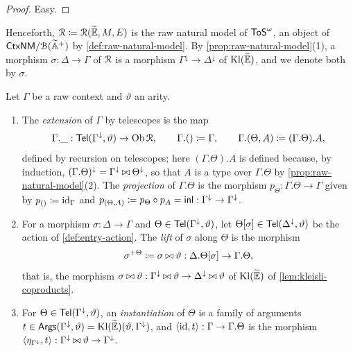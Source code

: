 \begin{proof}
    Easy.
\end{proof}

Henceforth, $\mathcal{R} \coloneqq \mathcal{R}(\widetilde{\mathbb{E}}, M, E)$ is the raw natural model of $\mathsf{ToS}^\omega$, an object of $\mathsf{CtxNM}/\mathcal{B}({\widetilde{\mathbb{A}}}^+)$ by \cref{def:raw-natural-model}. By \cref{prop:raw-natural-model}(1), a morphism $\sigma : \Delta \to \Gamma$ of $\mathcal{R}$ is a morphism $\Gamma^{\downarrow} \to \Delta^{\downarrow}$ of $\mathrm{Kl}(\widetilde{\mathbb{E}})$, and we denote both by $\sigma$.

\begin{definition}\label{def:telescope-operations}
    Let $\Gamma$ be a raw context and $\vartheta$ an arity.
    \begin{enumerate}
        \item The \emph{extension} of $\Gamma$ by telescopes is the map
        \[
            \Gamma.\_ : \mathsf{Tel}(\Gamma^{\downarrow}, \vartheta) \to \operatorname{Ob} \mathcal{R}, \qquad \Gamma.() \coloneqq \Gamma, \qquad \Gamma.(\Theta, A) \coloneqq (\Gamma.\Theta).A,
        \]
        defined by recursion on telescopes; here $(\Gamma.\Theta).A$ is defined because, by induction, $(\Gamma.\Theta)^{\downarrow} = \Gamma^{\downarrow} \mathbin{\bowtie} \Theta^{\downarrow}$, so that $A$ is a type over $\Gamma.\Theta$ by \cref{prop:raw-natural-model}(2). The \emph{projection} of $\Gamma.\Theta$ is the morphism $p_\Theta : \Gamma.\Theta \to \Gamma$ given by $p_{()} \coloneqq \mathrm{id}_\Gamma$ and $p_{(\Theta, A)} \coloneqq p_\Theta \circ p_A = \mathsf{inl} : \Gamma^{\downarrow} \to \Gamma^{\downarrow}$.
        \item For a morphism $\sigma : \Delta \to \Gamma$ and $\Theta \in \mathsf{Tel}(\Gamma^{\downarrow}, \vartheta)$, let $\Theta[\sigma] \in \mathsf{Tel}(\Delta^{\downarrow}, \vartheta)$ be the action of \cref{def:entry-action}. The \emph{lift} of $\sigma$ along $\Theta$ is the morphism
        \[
            \sigma^{+\Theta} \coloneqq \sigma \mathbin{\bowtie} \vartheta : \Delta.\Theta[\sigma] \to \Gamma.\Theta,
        \]
        that is, the morphism $\sigma \mathbin{\bowtie} \vartheta : \Gamma^{\downarrow} \mathbin{\bowtie} \vartheta \to \Delta^{\downarrow} \mathbin{\bowtie} \vartheta$ of $\mathrm{Kl}(\widetilde{\mathbb{E}})$ of \cref{lem:kleisli-coproducts}.
        \item For $\Theta \in \mathsf{Tel}(\Gamma^{\downarrow}, \vartheta)$, an \emph{instantiation} of $\Theta$ is a family of arguments $t \in \mathsf{Args}(\Gamma^{\downarrow}, \vartheta) = \mathrm{Kl}(\widetilde{\mathbb{E}})(\vartheta, \Gamma^{\downarrow})$, and $\langle \mathrm{id}, t \rangle : \Gamma \to \Gamma.\Theta$ is the morphism $\langle \eta_{\Gamma^{\downarrow}}, t \rangle : \Gamma^{\downarrow} \mathbin{\bowtie} \vartheta \to \Gamma^{\downarrow}$.

\end{enumerate}
\end{definition}
